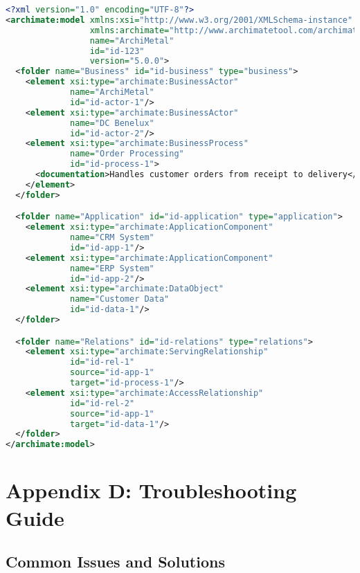 \documentclass[12pt,a4paper]{report}
\begin{document}
\begin{lstlisting}[language=XML, caption=Sample ArchiMate XML Structure]
<?xml version="1.0" encoding="UTF-8"?>
<archimate:model xmlns:xsi="http://www.w3.org/2001/XMLSchema-instance"
                 xmlns:archimate="http://www.archimatetool.com/archimate"
                 name="ArchiMetal"
                 id="id-123"
                 version="5.0.0">
  <folder name="Business" id="id-business" type="business">
    <element xsi:type="archimate:BusinessActor"
             name="ArchiMetal"
             id="id-actor-1"/>
    <element xsi:type="archimate:BusinessActor"
             name="DC Benelux"
             id="id-actor-2"/>
    <element xsi:type="archimate:BusinessProcess"
             name="Order Processing"
             id="id-process-1">
      <documentation>Handles customer orders from receipt to delivery</documentation>
    </element>
  </folder>

  <folder name="Application" id="id-application" type="application">
    <element xsi:type="archimate:ApplicationComponent"
             name="CRM System"
             id="id-app-1"/>
    <element xsi:type="archimate:ApplicationComponent"
             name="ERP System"
             id="id-app-2"/>
    <element xsi:type="archimate:DataObject"
             name="Customer Data"
             id="id-data-1"/>
  </folder>

  <folder name="Relations" id="id-relations" type="relations">
    <element xsi:type="archimate:ServingRelationship"
             id="id-rel-1"
             source="id-app-1"
             target="id-process-1"/>
    <element xsi:type="archimate:AccessRelationship"
             id="id-rel-2"
             source="id-app-1"
             target="id-data-1"/>
  </folder>
</archimate:model>
\end{lstlisting}

\section{Appendix D: Troubleshooting Guide}

\subsection{Common Issues and Solutions}
\end{document}
